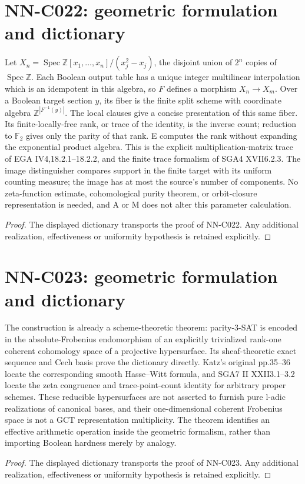 \section{NN-C022: geometric formulation and dictionary}
\begin{geometricstatement}[NN-C022]
Let $X_n=\operatorname{Spec}\mathbb Z[x_1,\ldots,x_n]/(x_j^2-x_j)$, the disjoint union of $2^n$ copies of $\operatorname{Spec}\mathbb Z$. Each Boolean output table has a unique integer multilinear interpolation which is an idempotent in this algebra, so $F$ defines a morphism $X_n\to X_m$. Over a Boolean target section $y$, its fiber is the finite split scheme with coordinate algebra $\mathbb Z^{|F^{-1}(y)|}$. The local clauses give a concise presentation of this same fiber. Its finite-locally-free rank, or trace of the identity, is the inverse count; reduction to $\mathbb F_2$ gives only the parity of that rank. E computes the rank without expanding the exponential product algebra. This is the explicit multiplication-matrix trace of EGA IV4,18.2.1--18.2.2, and the finite trace formalism of SGA4 XVII6.2.3. The image distinguisher compares support in the finite target with its uniform counting measure; the image has at most the source's number of components. No zeta-function estimate, cohomological purity theorem, or orbit-closure representation is needed, and A or M does not alter this parameter calculation.
\end{geometricstatement}
\begin{proof} The displayed dictionary transports the proof of NN-C022. Any additional realization, effectiveness or uniformity hypothesis is retained explicitly.\end{proof}


\section{NN-C023: geometric formulation and dictionary}
\begin{geometricstatement}[NN-C023]
The construction is already a scheme-theoretic theorem: parity-3-SAT is encoded in the absolute-Frobenius endomorphism of an explicitly trivialized rank-one coherent cohomology space of a projective hypersurface. Its sheaf-theoretic exact sequence and Cech basis prove the dictionary directly. Katz's original pp.35--36 locate the corresponding smooth Hasse--Witt formula, and SGA7 II XXII3.1--3.2 locate the zeta congruence and trace-point-count identity for arbitrary proper schemes. These reducible hypersurfaces are not asserted to furnish pure l-adic realizations of canonical bases, and their one-dimensional coherent Frobenius space is not a GCT representation multiplicity. The theorem identifies an effective arithmetic operation inside the geometric formalism, rather than importing Boolean hardness merely by analogy.
\end{geometricstatement}
\begin{proof} The displayed dictionary transports the proof of NN-C023. Any additional realization, effectiveness or uniformity hypothesis is retained explicitly.\end{proof}


